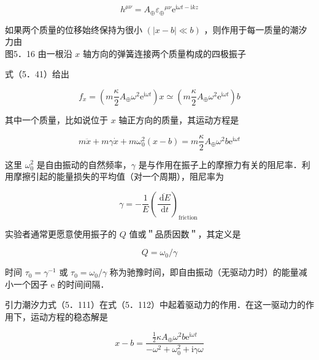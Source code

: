 \begin{equation*}
	h^{\mu \nu}=A_{\oplus} \varepsilon_{\oplus}{ }^{\mu \nu} \mathrm{e}^{\mathrm{i} \omega t-\mathrm{i} k z} \tag{5.110}
\end{equation*}


如果两个质量的位移始终保持为很小 $(|x-b| \ll b)$ ，则作用于每一质量的潮汐力由\\


图5．16 由一根沿 $x$ 轴方向的弹簧连接两个质量构成的四极振子

式（5．41）给出


\begin{equation*}
	f_{x}=\left(m \frac{\kappa}{2} A_{\oplus} \omega^{2} \mathrm{e}^{\mathrm{i} \omega t}\right) x \simeq\left(m \frac{\kappa}{2} A_{\oplus} \omega^{2} \mathrm{e}^{\mathrm{i} \omega t}\right) b \tag{5.111}
\end{equation*}


其中一个质量，比如说位于 $x$ 轴正方向的质量，其运动方程是


\begin{equation*}
	m \ddot{x}+m \gamma \dot{x}+m \omega_{0}^{2}(x-b)=m \frac{\kappa}{2} A_{\oplus} \omega^{2} b \mathrm{e}^{\mathrm{i} \omega t} \tag{5.112}
\end{equation*}


这里 $\omega_{0}^{2}$ 是自由振动的自然频率，$\gamma$ 是与作用在振子上的摩擦力有关的阻尼率．利用摩擦引起的能量损失的平均值（对一个周期），阻尼率为


\begin{equation*}
	\gamma=-\frac{1}{E}\left(\frac{\overline{\mathrm{~d} E}}{\mathrm{~d} t}\right)_{\text {friction }} \tag{5.113}
\end{equation*}


实验者通常更愿意使用振子的 $Q$ 值或＂品质因数＂，其定义是


\begin{equation*}
	Q=\omega_{0} / \gamma \tag{5.114}
\end{equation*}


时间 $\tau_{0}=\gamma^{-1}$ 或 $\tau_{0}=\omega_{0} / \gamma$ 称为驰豫时间，即自由振动（无驱动力时）的能量减小一个因子 e 的时间间隔．

引力潮汐力式（5．111）在式（5．112）中起着驱动力的作用．在这一驱动力的作用下，运动方程的稳态解是


\begin{equation*}
	x-b=\frac{\frac{1}{2} \kappa A_{\oplus} \omega^{2} b \mathrm{e}^{\mathrm{i} \omega t}}{-\omega^{2}+\omega_{0}^{2}+\mathrm{i} \gamma \omega} \tag{5.115}
\end{equation*}


